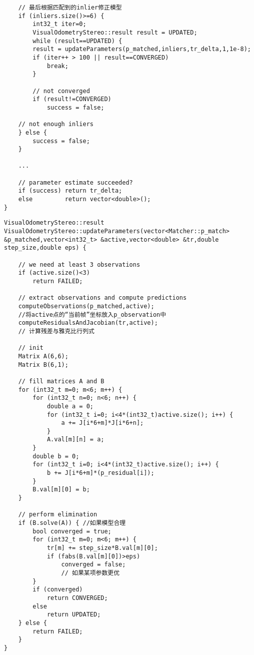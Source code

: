 \documentclass[UTF8]{ctexart}
\begin{document}
\begin{verbatim}
    // 最后根据匹配到的inlier修正模型
    if (inliers.size()>=6) {
        int32_t iter=0;
        VisualOdometryStereo::result result = UPDATED;
        while (result==UPDATED) {     
        result = updateParameters(p_matched,inliers,tr_delta,1,1e-8);
        if (iter++ > 100 || result==CONVERGED)
            break;
        }

        // not converged
        if (result!=CONVERGED)
            success = false;

    // not enough inliers
    } else {
        success = false;
    }

    ...
    
    // parameter estimate succeeded?
    if (success) return tr_delta;
    else         return vector<double>();
}
    \end{verbatim}
    \begin{verbatim}
VisualOdometryStereo::result VisualOdometryStereo::updateParameters(vector<Matcher::p_match> &p_matched,vector<int32_t> &active,vector<double> &tr,double step_size,double eps) {
    
    // we need at least 3 observations
    if (active.size()<3)
        return FAILED;
    
    // extract observations and compute predictions
    computeObservations(p_matched,active); 
    //将active点的“当前帧”坐标放入p_observation中
    computeResidualsAndJacobian(tr,active); 
    // 计算残差与雅克比行列式

    // init
    Matrix A(6,6);
    Matrix B(6,1);

    // fill matrices A and B
    for (int32_t m=0; m<6; m++) {
        for (int32_t n=0; n<6; n++) {
            double a = 0;
            for (int32_t i=0; i<4*(int32_t)active.size(); i++) {
                a += J[i*6+m]*J[i*6+n];
            }
            A.val[m][n] = a;
        }
        double b = 0;
        for (int32_t i=0; i<4*(int32_t)active.size(); i++) {
            b += J[i*6+m]*(p_residual[i]);
        }
        B.val[m][0] = b;
    }

    // perform elimination
    if (B.solve(A)) { //如果模型合理
        bool converged = true;
        for (int32_t m=0; m<6; m++) {
            tr[m] += step_size*B.val[m][0];
            if (fabs(B.val[m][0])>eps)
                converged = false;
                // 如果某项参数更优
        }
        if (converged)
            return CONVERGED;
        else
            return UPDATED;
    } else {
        return FAILED;
    }
}
    \end{verbatim}
\end{document}

